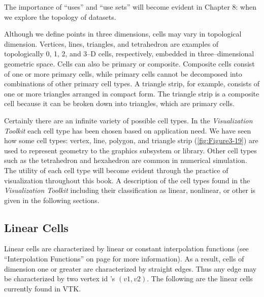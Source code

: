 The importance of ``uses'' and ``use sets'' will become evident in Chapter 8:  when we explore the topology of datasets.

Although we define points in three dimensions, cells may vary in topological dimension. Vertices, lines, triangles, and tetrahedron are examples of topologically 0, 1, 2, and 3--D cells, respectively, embedded in three--dimensional geometric space. Cells can also be primary or composite. Composite cells consist of one or more primary cells, while primary cells cannot be decomposed into combinations of other primary cell types. A triangle strip, for example, consists of one or more triangles arranged in compact form. The triangle strip is a composite cell because it can be broken down into triangles, which are primary cells.

Certainly there are an infinite variety of possible cell types. In the \emph{Visualization Toolkit} each cell type has been chosen based on application need. We have seen how some cell types: vertex, line, polygon, and triangle strip (\ref{fig:Figure3-19}) are used to represent geometry to the graphics subsystem or library. Other cell types such as the tetrahedron and hexahedron are common in numerical simulation. The utility of each cell type will become evident through the practice of visualization throughout this book. A description of the cell types found in the \emph{Visualization Toolkit} including their classification as linear, nonlinear, or other is given in the following sections.

\subsection{Linear Cells}

Linear cells are characterized by linear or constant interpolation functions (see ``Interpolation Functions'' on page \pageref{sec:interpolation_functions} for more information). As a result, cells of dimension one or greater are characterized by straight edges. Thus any edge may be characterized by two vertex id 's $(v1,v2)$. The following are the linear cells currently found in VTK.

